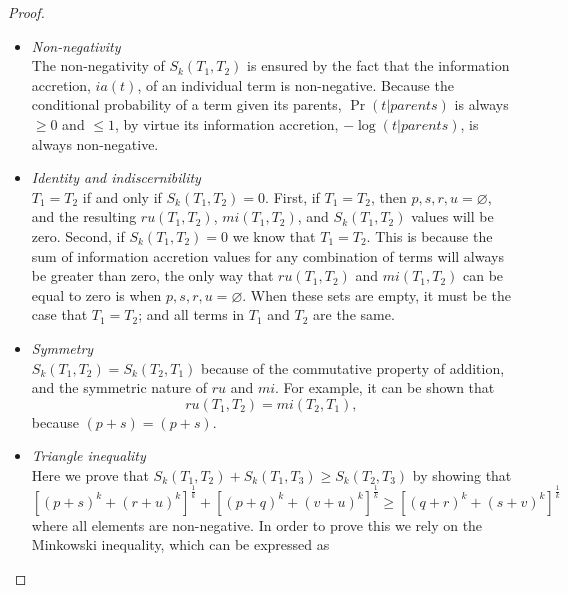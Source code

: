 \begin{proof}

~\begin{itemize}

\item \emph{Non-negativity}\\
The non-negativity of $S_{k}(T_{1},T_{2})$ is ensured by the fact that the information accretion, $ia(t)$, of an individual term is non-negative.  Because the conditional probability of a term given its parents, $\Pr (t|parents)$ is always $\geq 0$ and $\leq 1$, by virtue its information accretion, $-\log (t|parents)$, is always non-negative.


\item \emph{Identity and indiscernibility}\\
$T_{1}=T_{2}$ if and only if $S_{k}(T_{1},T_{2})=0$.  First, if $T_{1}=T_{2}$, then $p, s, r, u = \varnothing$, and the resulting $ru(T_{1},T_{2})$, $mi(T_{1},T_{2})$, and $S_{k}(T_{1},T_{2})$ values will be zero.  Second, if $S_{k}(T_{1},T_{2})=0$ we know that $T_{1}=T_{2}$.  This is because the sum of information accretion values for any combination of terms will always be greater than zero, the only way that $ru(T_{1},T_{2})$ and $mi(T_{1},T_{2})$ can be equal to zero is when $p, s, r, u = \varnothing$.  When these sets are empty, it must be the case that $T_{1}=T_{2}$; and all terms in $T_{1}$ and $T_{2}$ are the same.

\item \emph{Symmetry}\\
$S_{k}(T_{1},T_{2})=S_{k}(T_{2},T_{1})$ because of the commutative property of addition, and the symmetric nature of $ru$ and $mi$.  For example, it can be shown that 
\[
ru(T_{1},T_{2}) = mi(T_{2},T_{1}),
\]
because $(p+s)=(p+s)$.

\item \emph{Triangle inequality}\\
Here we prove that $S_{k}(T_{1}, T_{2})+S_{k}(T_{1},T_{3}) \geq S_{k}(T_{2},T_{3})$ by showing that
\[
\left[\left(p+s\right)^{k}+\left(r+u\right)^{k}\right]^{\frac{1}{k}}+\left[\left(p+q\right)^{k}+\left(v+u\right)^{k}\right]^{\frac{1}{k}}\geq\left[\left(q+r\right)^{k}+\left(s+v\right)^{k}\right]^{\frac{1}{k}}
\]
where all elements are non-negative.
In order to prove this we rely on the Minkowski inequality, which can be expressed as


\end{itemize}
\end{proof}
